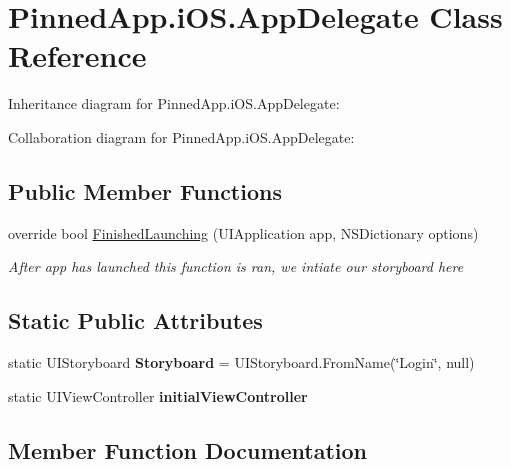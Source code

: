 \hypertarget{class_pinned_app_1_1i_o_s_1_1_app_delegate}{}\section{Pinned\+App.\+i\+O\+S.\+App\+Delegate Class Reference}
\label{class_pinned_app_1_1i_o_s_1_1_app_delegate}


Inheritance diagram for Pinned\+App.\+i\+O\+S.\+App\+Delegate\+:


Collaboration diagram for Pinned\+App.\+i\+O\+S.\+App\+Delegate\+:
\subsection*{Public Member Functions}
\begin{DoxyCompactItemize}
\item 
override bool \hyperlink{class_pinned_app_1_1i_o_s_1_1_app_delegate_a82d76c7b272ac52b3f1484f9bc67f155}{Finished\+Launching} (U\+I\+Application app, N\+S\+Dictionary options)
\begin{DoxyCompactList}\small\item\em After app has launched this function is ran, we intiate our storyboard here \end{DoxyCompactList}\end{DoxyCompactItemize}
\subsection*{Static Public Attributes}
\begin{DoxyCompactItemize}
\item 
\mbox{\label{class_pinned_app_1_1i_o_s_1_1_app_delegate_aac6920bb6027750792a093596ca3e0df}} 
static U\+I\+Storyboard {\bfseries Storyboard} = U\+I\+Storyboard.\+From\+Name(\char`\"{}Login\char`\"{}, null)
\item 
\mbox{\label{class_pinned_app_1_1i_o_s_1_1_app_delegate_a89ecfecd64027fb5b9f2e42b45c1af8f}} 
static U\+I\+View\+Controller {\bfseries initial\+View\+Controller}
\end{DoxyCompactItemize}


\subsection{Member Function Documentation}
\mbox{\label{class_pinned_app_1_1i_o_s_1_1_app_delegate_a82d76c7b272ac52b3f1484f9bc67f155}} 
